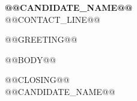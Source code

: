 \documentclass[11pt,a4paper]{article}
\begin{document}
{\LARGE\textbf{@@CANDIDATE_NAME@@}}\\[0.45em]
@@CONTACT_LINE@@

\vspace{1.1em}

@@GREETING@@

\vspace{0.5em}

@@BODY@@

\vspace{0.8em}

@@CLOSING@@\\[1.2em]
@@CANDIDATE_NAME@@
\end{document}
